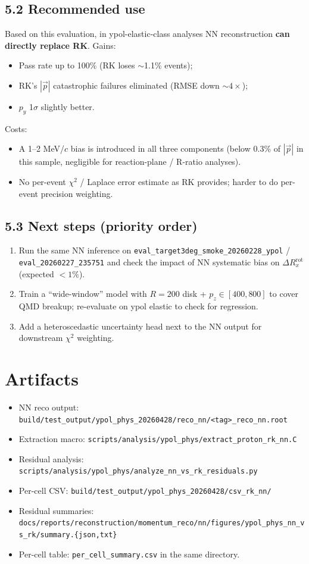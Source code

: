 \documentclass[a4paper,11pt]{article}
\begin{document}
\subsection*{5.2 Recommended use}
Based on this evaluation, in ypol-elastic-class analyses NN reconstruction \textbf{can directly replace RK}. Gains:
\begin{itemize}[nosep]
    \item Pass rate up to 100\% (RK loses $\sim$1.1\% events);
    \item RK's $|\vec p|$ catastrophic failures eliminated (RMSE down $\sim 4\times$);
    \item $p_y$ 1$\sigma$ slightly better.
\end{itemize}
Costs:
\begin{itemize}[nosep]
    \item A 1--2 MeV/$c$ bias is introduced in all three components (below 0.3\% of $|\vec p|$ in this sample, negligible for reaction-plane / R-ratio analyses).
    \item No per-event $\chi^2$ / Laplace error estimate as RK provides; harder to do per-event precision weighting.
\end{itemize}

\subsection*{5.3 Next steps (priority order)}
\begin{enumerate}[nosep]
    \item Run the same NN inference on \texttt{eval\_target3deg\_smoke\_20260228\_ypol} / \texttt{eval\_20260227\_235751} and check the impact of NN systematic bias on $\Delta R_x^\text{rot}$ (expected $<1\%$).
    \item Train a ``wide-window'' model with $R = 200$ disk + $p_z\in[400, 800]$ to cover QMD breakup; re-evaluate on ypol elastic to check for regression.
    \item Add a heteroscedastic uncertainty head next to the NN output for downstream $\chi^2$ weighting.
\end{enumerate}

\section*{Artifacts}
\begin{itemize}[nosep]
    \item NN reco output: \texttt{build/test\_output/ypol\_phys\_20260428/reco\_nn/<tag>\_reco\_nn.root}
    \item Extraction macro: \texttt{scripts/analysis/ypol\_phys/extract\_proton\_rk\_nn.C}
    \item Residual analysis: \texttt{scripts/analysis/ypol\_phys/analyze\_nn\_vs\_rk\_residuals.py}
    \item Per-cell CSV: \texttt{build/test\_output/ypol\_phys\_20260428/csv\_rk\_nn/}
    \item Residual summaries: \texttt{docs/reports/reconstruction/momentum\_reco/nn/figures/ypol\_phys\_nn\_vs\_rk/summary.\{json,txt\}}
    \item Per-cell table: \texttt{per\_cell\_summary.csv} in the same directory.
\end{itemize}
\end{document}
